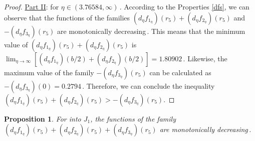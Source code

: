 \documentclass[final,11pt]{article}
\numberwithin{equation}{section}
\newtheorem{proposition}[theorem]{Proposition}
\theoremstyle{definition}
\begin{document}
\begin{proof}
\underline{Part II}: for $\eta\in(3.76584,\infty)$\,. According to the Properties \ref{dfs}, we can observe that the functions of the families $\left(d_{\eta}f_{1_{\eta}}\right)(r_{5})+\left(d_{\eta}f_{2_{\eta}}\right)(r_{5})$ and $-\left(d_{\eta}f_{3_{\eta}}\right)(r_{5})$ are monotonically decreasing\,. This means that the minimum value of $\left(d_{\eta}f_{1_{\eta}}\right)(r_{5})+\left(d_{\eta}f_{2_{\eta}}\right)(r_{5})$ is $\displaystyle \lim_{\eta\rightarrow \infty} \left[\left(d_{\eta}f_{1_{\eta}}\right)(b/2 )+\left(d_{\eta}f_{2_{\eta}}\right)(b/2)\right]=1.80902$\,. Likewise, the maximum value of the family $-\left(d_{\eta}f_{3_{\eta}}\right)(r_{5})$ can be calculated as $-\left(d_{\eta}f_{3_{\eta}}\right)(0)=0.2794$\,. Therefore, we can conclude the inequality $\left(d_{\eta} f_{1_{\eta}}\right)(r_{5}) + \left(d_{\eta} f_{2_{\eta}}\right)(r_{5})>-\left(d_{\eta} f_{3_{\eta}}\right)(r_{5})$.
\end{proof}

\begin{proposition}\label{aux3}
For into $J_{1}$, the functions of the family $\left(d_{\eta}f_{1_{\eta}}\right)(r_{5})+\left(d_{\eta}f_{2_{\eta}}\right)(r_{5})+\left(d_{\eta}f_{3_{\eta}}\right)(r_{5})$ are monotonically decreasing\,. 
\end{proposition}
\end{document}
